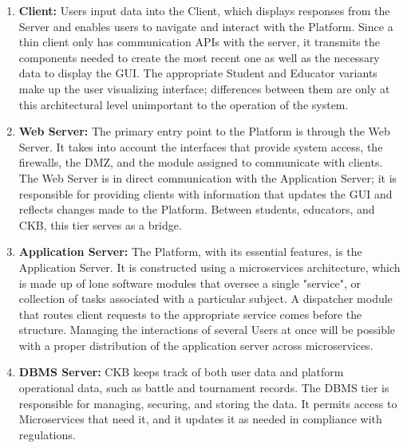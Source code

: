 \begin{enumerate}[label=$\bullet$]
    \item \textbf{Client:} Users input data into the Client, which displays responses from the Server and enables users to navigate and interact with the Platform. Since a thin client only has communication APIs with the server, 
    it transmits the components needed to create the most recent one as well as the necessary data to display the GUI. The appropriate Student and Educator variants make up the user visualizing interface; differences between them 
    are only at this architectural level unimportant to the operation of the system.
    \item \textbf{Web Server:} The primary entry point to the Platform is through the Web Server. It takes into account the interfaces that provide system access, the firewalls, the DMZ, and the module assigned to communicate with 
    clients. The Web Server is in direct communication with the Application Server; it is responsible for providing clients with information that updates the GUI and reflects changes made to the Platform. Between students, educators, 
    and CKB, this tier serves as a bridge.
    \item \textbf{Application Server:} The Platform, with its essential features, is the Application Server. It is constructed using a microservices architecture, which is made up of lone software modules that oversee a single 
    "service", or collection of tasks associated with a particular subject. A dispatcher module that routes client requests to the appropriate service comes before the structure. Managing the interactions of several Users at once 
    will be possible with a proper distribution of the application server across microservices.
    \item \textbf{DBMS Server:} CKB keeps track of both user data and platform operational data, such as battle and tournament records. The DBMS tier is responsible for managing, securing, and storing the data. It permits access to 
    Microservices that need it, and it updates it as needed in compliance with regulations.
\end{enumerate}

